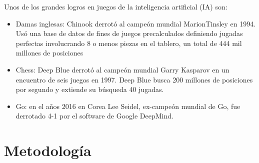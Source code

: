 \documentclass{beamer}
\begin{document}
\begin{frame}
Unos de los grandes logros en juegos de la inteligencia artificial (IA) son:
\begin{itemize}

    \item Damas inglesas: Chinook derrotó al campeón mundial MarionTinsley en 1994. Usó una base de datos de fines de juegos precalculados definiendo jugadas perfectas involucrando 8 o menos piezas en el tablero, un total de 444 mil millones de posiciones
    \item Chess: Deep Blue derrotó al campeón mundial Garry Kasparov en un encuentro de seis juegos en 1997. Deep Blue busca 200 millones de posiciones por segundo y extiende su búsqueda 40 jugadas.
    \item Go: en el años 2016 en Corea Lee Seidel, ex-campeón mundial de Go, fue derrotado 4-1 por el software de Google DeepMind.
\end{itemize}
\end{frame}

\section{Metodología}
\end{document}
